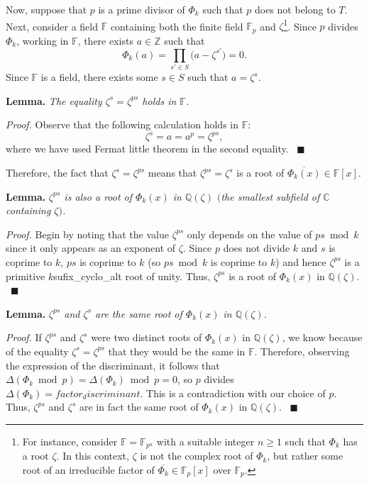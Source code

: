 \documentclass[a4paper, 12pt]{article}
\theoremstyle{definition}
\newcommand{\Z}{\mathbb{Z}}
\newcommand{\Q}{\mathbb{Q}}
\newcommand{\C}{\mathbb{C}}
\newcommand{\F}{\mathbb{F}}
\begin{document}
Now, suppose that $p$ is a prime divisor of $\Phi_{{k}}$ such that $p$ does not belong to $T$. Next, consider a field $\F$ containing both the finite field $\F_p$ and $\zeta$\footnote{For instance, consider $\F=\F_{p^n}$ with a suitable integer $n\geqslant 1$ such that $\Phi_{{k}}$ has a root $\zeta$. In this context, $\zeta$ is not the complex root of $\Phi_{{k}}$, but rather some root of an irreducible factor of $\overline{\Phi_{{k}}}\in\F_p[x]$ over $\F_p$.}. Since $p$ divides $\Phi_{{k}}$, working in $\F$, there exists $a\in\Z$ such that 
\begin{equation*}
\Phi_{{k}}(a)=\prod_{s'\in S}\big(a-\zeta^{s'}\big)=0.
\end{equation*}
Since $\F$ is a field, there exists some $s\in S$ such that $a=\zeta^{s}$.

\textbf{Lemma.} \emph{The equality $\zeta^s=\zeta^{ps}$ holds in $\F$.}

\textit{Proof.} Observe that the following calculation holds in $\F$:
\begin{equation*}\label{eq:reproots}
\zeta^{s}=a=a^p=\zeta^{ps},
\end{equation*}
where we have used Fermat little theorem in the second equality. \ $\blacksquare$ 

Therefore, the fact that $\zeta^{s}=\zeta^{ps}$ means that $\zeta^{ps}=\zeta^{s}$ is a root of $\overline{\Phi_{{k}}(x)}\in\F[x]$. 

\textbf{Lemma.} \emph{$\zeta^{ps}$ is also a root of $\Phi_{{k}}(x)$ in $\Q(\zeta)$ $($the smallest subfield of $\C$ containing $\zeta)$.}

\textit{Proof.} Begin by noting that the value $\zeta^{ps}$ only depends on the value of $ps \bmod{{k}}$ since it only appears as an exponent of $\zeta$. Since $p$ does not divide ${k}$ and $s$ is coprime to ${k}$, $ps$ is coprime to ${k}$ (so $ps \bmod{{k}}$ is coprime to ${k}$) and hence $\zeta^{ps}$ is a primitive ${k}${sufix_cyclo_alt} root of unity. Thus, $\zeta^{ps}$ is a root of $\Phi_{{k}}(x)$ in $\Q(\zeta)$. \ $\blacksquare$

\textbf{Lemma.} \emph{$\zeta^{ps}$ and $\zeta^{s}$ are the same root of $\Phi_{{k}}(x)$ in $\Q(\zeta)$.}

\textit{Proof.} If $\zeta^{ps}$ and $\zeta^{s}$ were two distinct roots of $\Phi_{{k}}(x)$ in $\Q(\zeta)$, we know because of the equality $\zeta^{s}=\zeta^{ps}$ that they would be the same in $\F$. Therefore, observing the expression of the discriminant, it follows that $\Delta(\Phi_{{k}} \bmod{p})=\Delta(\Phi_{{k}}) \bmod{p}=0$, so $p$ divides $\Delta(\Phi_{{k}})={factor_discriminant}$. This is a contradiction with our choice of $p$. Thus, $\zeta^{ps}$ and $\zeta^{s}$ are in fact the same root of $\Phi_{{k}}(x)$ in $\Q(\zeta)$. \ $\blacksquare$
\end{document}
